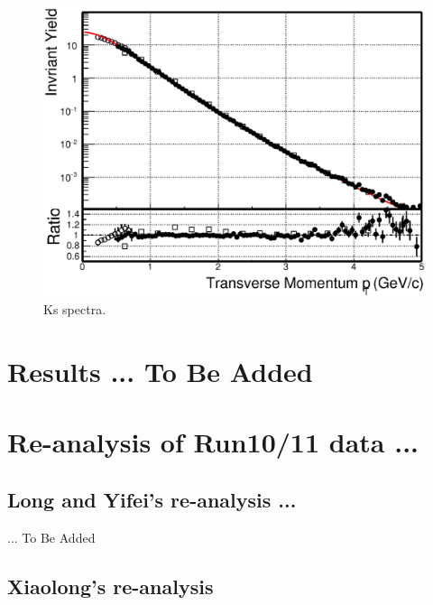 \documentclass[a4paper]{article}
\begin{document}
\begin{figure}
\centering
\includegraphics[width=0.7\columnwidth]{figure/Run14_D0HFT/Ks_spectra_PtCut_0.eps}
\caption{Ks spectra.}
\label{Ks_spectra}
\end{figure}

\section{\label{results}Results ... To Be Added}


\section{\label{Run1011}Re-analysis of Run10/11 data ... }

\subsection{Long and Yifei's re-analysis ... }


... To Be Added

\subsection{Xiaolong's re-analysis}




\clearpage


% 
\end{document}
